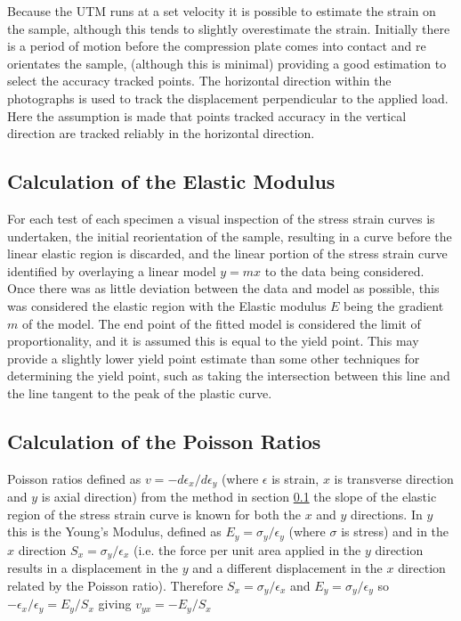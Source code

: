 \documentclass[10pt]{article}
\begin{document}
Because the UTM runs at a set velocity it is possible to estimate the strain on the sample, although this tends to slightly
overestimate the strain. Initially there is a period of motion before the compression plate comes into contact and re orientates
the sample, (although this is minimal) providing a good estimation to select the accuracy tracked points.
The horizontal direction within the photographs is used to track the displacement perpendicular to the applied load.
Here the assumption is made that points tracked accuracy in the vertical
direction are tracked reliably in the horizontal direction.

\subsection{Calculation of the Elastic Modulus}
\label{sec:calc_E}
For each test of each specimen a visual inspection of the stress strain curves is undertaken, the initial reorientation of the sample,
resulting in a curve before the linear elastic region is discarded, and the linear portion of the stress strain curve identified
by overlaying a linear model \(y=mx\) to the data being considered. Once there was as little deviation between the data and model
as possible, this was considered the elastic region with the Elastic modulus \(E\) being the gradient \(m\) of the model.
The end point of the fitted model is considered the limit of proportionality, and it is assumed this is equal to the yield point.
This may provide a slightly lower yield point estimate than some other techniques for determining the yield point, such as taking the
 intersection  between this line and the line tangent to the peak of the plastic curve.

\subsection{Calculation of the Poisson Ratios}

Poisson ratios defined as \(v = -d\epsilon_x /d\epsilon_y \)  \citep{bodig_jozsef_jayne_mechanics_1982} (where \(\epsilon\)
is strain, \(x\) is transverse direction and \(y\) is axial direction) from the method in section \ref{sec:calc_E} the slope
of the elastic region of the stress strain curve is known for both the \(x\) and \(y\) directions. In \(y\) this is the Young's
Modulus, defined as \(E_y = \sigma_y / \epsilon_y\) (where \(\sigma\) is stress)  \citep{bodig_jozsef_jayne_mechanics_1982} and
in the \(x\) direction \(S_x = \sigma_y / \epsilon_x\) (i.e. the force per unit area applied in the \(y\) direction results in a
displacement in the \(y\) and a different displacement in the \(x\) direction related by the Poisson ratio).
Therefore \(S_x = \sigma_y / \epsilon_x \) and \(E_y = \sigma_y / \epsilon_y\) so \(-\epsilon_x / \epsilon_y = E_y/S_x\)
giving \(v_{yx} = -E_y/S_x\)
\end{document}
